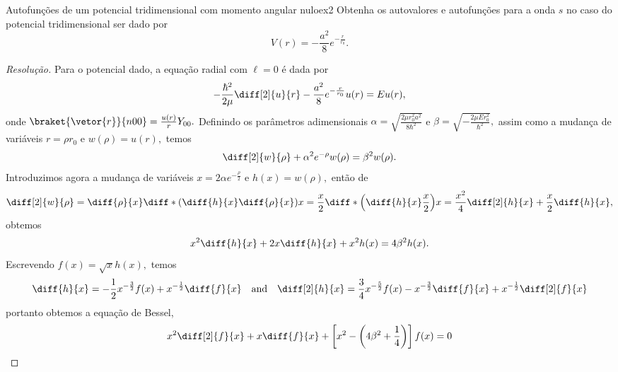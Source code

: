 \begin{exercício}{Autofunções de um potencial tridimensional com momento angular nulo}{ex2}
    Obtenha os autovalores e autofunções para a onda \(s\) no caso do potencial tridimensional ser dado por
    \begin{equation*}
        V(r) = -\frac{a^2}{8} e^{-\frac{r}{r_0}}.
    \end{equation*}
\end{exercício}
\begin{proof}[Resolução]
    Para o potencial dado, a equação radial com \(\ell = 0\) é dada por
    \begin{equation*}
        -\frac{\hbar^2}{2\mu} \diff[2]{u}{r} - \frac{a^2}{8} e^{-\frac{r}{r_0}}u(r) = E u(r),
    \end{equation*}
    onde \(\braket{\vetor{r}}{n00} = \frac{u(r)}{r} Y_{00}.\) Definindo os parâmetros adimensionais \(\alpha = \sqrt{\frac{2\mu r_0^2 a^2}{8 \hbar^2}}\) e \(\beta = \sqrt{-\frac{2\mu E r_0^2}{\hbar^2}},\) assim como a mudança de variáveis \(r = \rho r_0\) e \(w(\rho) = u(r),\) temos
    \begin{equation*}
        \diff[2]{w}{\rho} + \alpha^2 e^{-\rho} w(\rho) = \beta^2 w(\rho).
    \end{equation*}
    Introduzimos agora a mudança de variáveis \(x = 2 \alpha e^{-\frac{\rho}{2}}\) e \(h(x) = w(\rho),\) então de
    \begin{equation*}
        \diff[2]{w}{\rho} = \diff{\rho}{x}\diff*{\left(\diff{h}{x} \diff{\rho}{x}\right)}{x} = \frac{x}{2} \diff*{\left(\diff{h}{x} \frac{x}{2}\right)}{x} = \frac{x^2}{4}\diff[2]{h}{x} + \frac{x}{2} \diff{h}{x},
    \end{equation*}
    obtemos
    \begin{equation*}
        x^2 \diff{h}{x} + 2x \diff{h}{x} + x^2 h(x) = 4\beta^2 h(x).
    \end{equation*}
    Escrevendo \(f(x) = \sqrt{x} h(x),\) temos
    \begin{equation*}
        \diff{h}{x} = -\frac12 x^{-\frac32}f(x) + x^{-\frac12} \diff{f}{x}
        \quad\text{and}\quad
        \diff[2]{h}{x} = \frac{3}{4} x^{-\frac52} f(x) -  x^{-\frac32} \diff{f}{x}  + x^{-\frac12}\diff[2]{f}{x}
    \end{equation*}
    portanto obtemos a equação de Bessel,
    \begin{equation*}
        x^2 \diff[2]{f}{x} + x \diff{f}{x} + \left[x^2 - \left(4 \beta^2 + \frac14\right)\right] f(x) = 0
    \end{equation*}

\end{proof}
